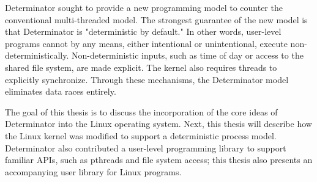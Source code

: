 Determinator sought to provide a new programming model to counter the
conventional multi-threaded model. The strongest guarantee of the new model
is that Determinator is "deterministic by default." In other words, user-level
programs cannot by any means, either intentional or unintentional, execute
non-deterministically. Non-deterministic inputs, such as time of day or access
to the shared file system, are made explicit. The kernel also requires threads
to explicitly synchronize. Through these mechanisms, the Determinator model
eliminates data races entirely.

The goal of this thesis is to discuss the incorporation of the core ideas of
Determinator into the Linux operating system. Next, this thesis will describe
how the Linux kernel was modified to support a deterministic process model.
Determinator also contributed a user-level programming library to support
familiar APIs, such as pthreads and file system access; this thesis also
presents an accompanying user library for Linux programs.

\fi
\endinput


